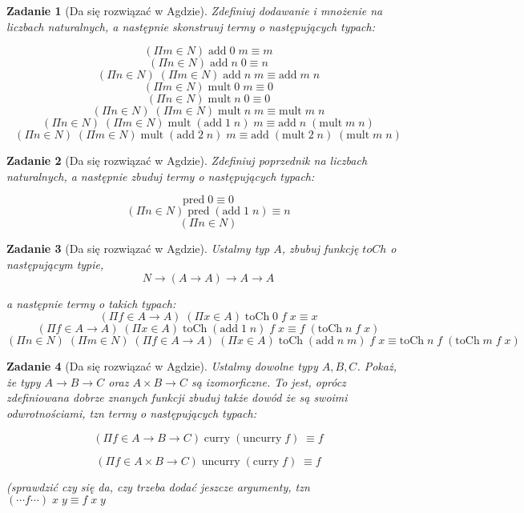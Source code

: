 \documentclass[11pt, a4paper]{article}
\newtheorem{zadanie}{Zadanie}
\begin{document}
\begin{zadanie}[Da się rozwiązać w Agdzie]
Zdefiniuj dodawanie i mnożenie na liczbach naturalnych, a następnie skonstruuj termy o następujących typach:

\[
 (\Pi m \in N)\;\mbox{add}\;0\;m \equiv m
\]
\[
 (\Pi n \in N)\;\mbox{add}\;n\;0 \equiv n
\]
\[
 (\Pi n \in N)\;(\Pi m \in N)\;\mbox{add}\;n\;m \equiv \mbox{add}\;m\;n
\]
\[
 (\Pi m \in N)\;\mbox{mult}\;0\;m \equiv 0
\]
\[
 (\Pi n \in N)\;\mbox{mult}\;n\;0 \equiv 0
\]
\[
 (\Pi n \in N)\;(\Pi m \in N)\;\mbox{mult}\;n\;m \equiv \mbox{mult}\;m\;n
\]
\[
 (\Pi n \in N)\;(\Pi m \in N)\;\mbox{mult}\;(\mbox{add}\;1\;n)\;m \equiv \mbox{add}\;n\;(\mbox{mult}\;m\;n)
\]
\[
 (\Pi n \in N)\;(\Pi m \in N)\;\mbox{mult}\;(\mbox{add}\;2\;n)\;m \equiv \mbox{add}\;(\mbox{mult}\; 2\; n)\;(\mbox{mult}\;m\;n)
\]

\end{zadanie}

\begin{zadanie}[Da się rozwiązać w Agdzie]
 Zdefiniuj poprzednik na liczbach naturalnych, a następnie zbuduj termy o następujących typach:

\[
  \mbox{pred}\;0 \equiv 0
\]
\[
  (\Pi n \in N)\;  \mbox{pred}\;(\mbox{add}\;1\;n) \equiv n
\]
\[
 (\Pi n \in N) 
\]

\end{zadanie}


\begin{zadanie}[Da się rozwiązać w Agdzie]
 Ustalmy typ $A$, zbubuj funkcję $toCh$ o następującym typie,
\[
  N \to (A \to A) \to A \to A
\]

a następnie termy o takich typach:
\[
 (\Pi f \in A \to A)\;(\Pi x \in A)\;\mbox{toCh}\;0\;f\;x \equiv x
\]
\[
 (\Pi f \in A \to A)\;(\Pi x \in A)\;\mbox{toCh}\;(\mbox{add}\;1\;n)\;f\;x \equiv f\;(\mbox{toCh}\;n\;f\;x)
\]
\[
 (\Pi n \in N)\;(\Pi m \in N)\;(\Pi f \in A \to A)\;(\Pi x \in A)\;
\mbox{toCh}\;(\mbox{add}\;n\;m)\;f\;x
\equiv
\mbox{toCh}\;n\;f\;(\mbox{toCh}\;m\;f\;x)
\]

\end{zadanie}


\begin{zadanie}[Da się rozwiązać w Agdzie]
 Ustalmy dowolne typy $A, B, C$.
 Pokaż, że typy $A \to B \to C$ oraz $A \times B \to C$ są izomorficzne. To jest, oprócz zdefiniowana dobrze
znanych funkcji zbuduj także dowód że są swoimi odwrotnościami, tzn termy o następujących typach:

\[
(\Pi f \in A \to B \to C)\; \mbox{curry}\; (\mbox{uncurry}\; f)\; \equiv f
\]

\[
(\Pi f \in A \times B \to C)\; \mbox{uncurry}\; (\mbox{curry}\; f)\; \equiv f
\]



(sprawdzić czy się da, czy trzeba dodać jeszcze argumenty, tzn $ (\cdots f \cdots )\;x\;y \equiv f \;x\;y$
\end{zadanie}
\end{document}
